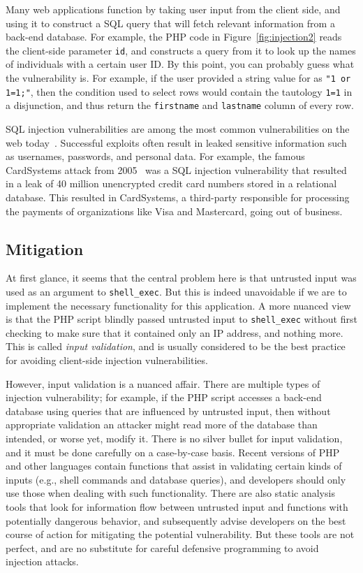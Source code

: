 \documentclass[11pt,twoside]{scrartcl}
\begin{document}
Many web applications function by taking user input from the client side, and using it to construct a SQL query that will fetch relevant information from a back-end database. For example, the PHP code in Figure~\ref{fig:injection2} reads the client-side parameter \verb'id', and constructs a  query from it to look up the names of individuals with a certain user ID. By this point, you can probably guess what the vulnerability is. For example, if the user provided a string value for  as \verb'"1 or 1=1;"', then the condition used to select rows would contain the tautology \verb'1=1' in a disjunction, and thus return the \verb'firstname' and \verb'lastname' column of every row.

SQL injection vulnerabilities are among the most common vulnerabilities on the web today~\cite{owasp10}. Successful exploits often result in leaked sensitive information such as usernames, passwords, and personal data. For example, the famous CardSystems attack from 2005~\cite{cardsystems} was a SQL injection vulnerability that resulted in a leak of 40 million unencrypted credit card numbers stored in a relational database. This resulted in CardSystems, a third-party responsible for processing the payments of organizations like Visa and Mastercard, going out of business.

\subsection{Mitigation}
At first glance, it seems that the central problem here is that untrusted input was used as an argument to \verb'shell_exec'. But this is indeed unavoidable if we are to implement the necessary functionality for this application. A more nuanced view is that the PHP script blindly passed untrusted input to \verb'shell_exec' without first checking to make sure that it contained only an IP address, and nothing more. This is called \emph{input validation}, and is usually considered to be the best practice for avoiding client-side injection vulnerabilities. 

However, input validation is a nuanced affair. There are multiple types of injection vulnerability; for example, if the PHP script accesses a back-end database using queries that are influenced by untrusted input, then without appropriate validation an attacker might read more of the database than intended, or worse yet, modify it. There is no silver bullet for input validation, and it must be done carefully on a case-by-case basis. Recent versions of PHP and other languages contain functions that assist in validating certain kinds of inputs (e.g., shell commands and database queries), and developers should only use those when dealing with such functionality. There are also static analysis tools that look for information flow between untrusted input and functions with potentially dangerous behavior, and subsequently advise developers on the best course of action for mitigating the potential vulnerability. But these tools are not perfect, and are no substitute for careful defensive programming to avoid injection attacks.
\end{document}
